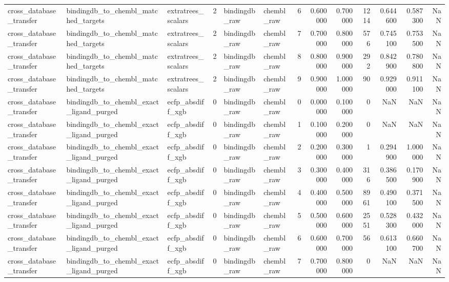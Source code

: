 \begin{longtable}{lllrllrrrrrrr}
cross\_database\_transfer & bindingdb\_to\_chembl\_matched\_targets & extratrees\_scalars & 2 & bindingdb\_raw & chembl\_raw & 6 & 0.600000 & 0.700000 & 1214 & 0.644600 & 0.587300 & NaN \\
cross\_database\_transfer & bindingdb\_to\_chembl\_matched\_targets & extratrees\_scalars & 2 & bindingdb\_raw & chembl\_raw & 7 & 0.700000 & 0.800000 & 576 & 0.745100 & 0.753500 & NaN \\
cross\_database\_transfer & bindingdb\_to\_chembl\_matched\_targets & extratrees\_scalars & 2 & bindingdb\_raw & chembl\_raw & 8 & 0.800000 & 0.900000 & 292 & 0.842900 & 0.780800 & NaN \\
cross\_database\_transfer & bindingdb\_to\_chembl\_matched\_targets & extratrees\_scalars & 2 & bindingdb\_raw & chembl\_raw & 9 & 0.900000 & 1.000000 & 90 & 0.929000 & 0.911100 & NaN \\
cross\_database\_transfer & bindingdb\_to\_chembl\_exact\_ligand\_purged & ecfp\_absdiff\_xgb & 0 & bindingdb\_raw & chembl\_raw & 0 & 0.000000 & 0.100000 & 0 & NaN & NaN & NaN \\
cross\_database\_transfer & bindingdb\_to\_chembl\_exact\_ligand\_purged & ecfp\_absdiff\_xgb & 0 & bindingdb\_raw & chembl\_raw & 1 & 0.100000 & 0.200000 & 0 & NaN & NaN & NaN \\
cross\_database\_transfer & bindingdb\_to\_chembl\_exact\_ligand\_purged & ecfp\_absdiff\_xgb & 0 & bindingdb\_raw & chembl\_raw & 2 & 0.200000 & 0.300000 & 1 & 0.294900 & 1.000000 & NaN \\
cross\_database\_transfer & bindingdb\_to\_chembl\_exact\_ligand\_purged & ecfp\_absdiff\_xgb & 0 & bindingdb\_raw & chembl\_raw & 3 & 0.300000 & 0.400000 & 316 & 0.386500 & 0.170900 & NaN \\
cross\_database\_transfer & bindingdb\_to\_chembl\_exact\_ligand\_purged & ecfp\_absdiff\_xgb & 0 & bindingdb\_raw & chembl\_raw & 4 & 0.400000 & 0.500000 & 8961 & 0.490100 & 0.371500 & NaN \\
cross\_database\_transfer & bindingdb\_to\_chembl\_exact\_ligand\_purged & ecfp\_absdiff\_xgb & 0 & bindingdb\_raw & chembl\_raw & 5 & 0.500000 & 0.600000 & 2551 & 0.528300 & 0.432000 & NaN \\
cross\_database\_transfer & bindingdb\_to\_chembl\_exact\_ligand\_purged & ecfp\_absdiff\_xgb & 0 & bindingdb\_raw & chembl\_raw & 6 & 0.600000 & 0.700000 & 56 & 0.613100 & 0.660700 & NaN \\
cross\_database\_transfer & bindingdb\_to\_chembl\_exact\_ligand\_purged & ecfp\_absdiff\_xgb & 0 & bindingdb\_raw & chembl\_raw & 7 & 0.700000 & 0.800000 & 0 & NaN & NaN & NaN \\

\end{longtable}
